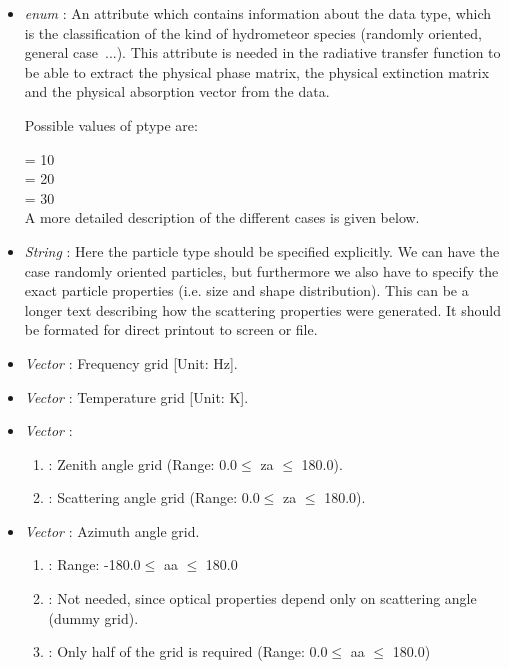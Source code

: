 \begin{itemize}
\item  {\sl enum} : An attribute which contains
  information about the 
  data type, which is the classification of the kind of hydrometeor
  species (randomly oriented, general case~...). This attribute is
  needed in the radiative transfer function to be able to extract
  the physical phase matrix, the physical extinction matrix and the
  physical absorption vector from the data. 
  
  Possible values of ptype are:
  
   = 10 \\
   = 20\\
   = 30\\
  
  A more detailed description of the different cases is given below.

\item {\sl String} : Here the particle type
  should be specified 
  explicitly. We can have the case randomly oriented particles, but
  furthermore we also have to specify the exact particle properties
  (i.e. size and shape distribution). This can be a longer text
  describing how the scattering properties were generated. It should
  be formated for direct printout to screen or file.
  
\item {\sl Vector} : Frequency grid [Unit: Hz].
  
\item {\sl Vector} : Temperature grid [Unit: K].
  
\item {\sl Vector} :
  \begin{enumerate}
  \item {}: Zenith angle grid (Range: 0.0\degree $\le$ za $\le$ 180.0\degree).
  \item {}: Scattering angle grid (Range: 0.0\degree $\le$ za $\le$ 180.0\degree).
  \end{enumerate}
  
\item {\sl Vector} : Azimuth angle grid.
  \begin{enumerate}
  \item {}: Range: -180.0\degree $\le$ aa $\le$ 180.0\degree
  \item {}: Not needed, since optical properties depend only on
    scattering angle (dummy grid).
  \item {}: Only half of the grid is required (Range: 0.0\degree $\le$ aa $\le$ 180.0\degree)
  \end{enumerate}
  

\end{itemize}

